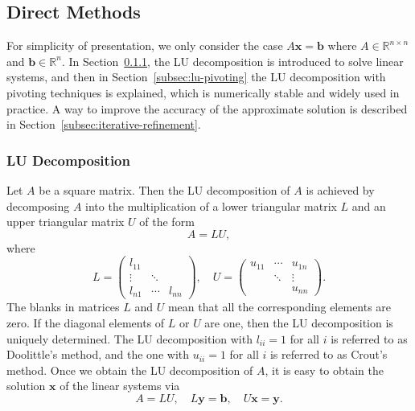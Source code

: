 \subsection{{Direct Methods}}\label{sec:direct-methods}
{For simplicity of presentation, we only consider the case $A\bm x=\bm b$ where $A\in\mathbb R^{n\times n}$ and $\bm b\in\mathbb R^n$. In Section~\ref{subsec:lu-decomposition}, the LU decomposition is introduced to solve linear systems, and then in Section~\ref{subsec:lu-pivoting} the LU decomposition with pivoting techniques is explained, which is numerically stable and widely used in practice. A way to improve the accuracy of the approximate solution is described in Section~\ref{subsec:iterative-refinement}.}
\subsubsection{{LU Decomposition}}\label{subsec:lu-decomposition}
{Let $A$ be a square matrix. Then the LU decomposition of $A$ is achieved by decomposing $A$ into the multiplication of a lower triangular matrix $L$ and an upper triangular matrix $U$ of the form}
\begin{equation}\label{eq:lu-factorization}A=LU,\end{equation}
{where}
\[
L=\begin{pmatrix}l_{11}&&\\\vdots&\ddots&\\l_{n1}&\cdots&l_{nn}\end{pmatrix},\quad
U=\begin{pmatrix}u_{11}&\cdots&u_{1n}\\&\ddots&\vdots\\&&u_{nn}\end{pmatrix}.
\]
{The blanks in matrices $L$ and $U$ mean that all the corresponding elements are zero.}
{If the diagonal elements of $L$ or $U$ are one, then the LU decomposition is uniquely determined. The LU decomposition with $l_{ii}=1$ for all $i$ is referred to as Doolittle's method, and the one with $u_{ii}=1$ for all $i$ is referred to as Crout's method. Once we obtain the LU decomposition of $A$, it is easy to obtain the solution $\bm x$ of the linear systems via}
\begin{equation}\label{eq:lu-triangular-solves}A=LU,\quad L\bm y=\bm b,\quad U\bm x=\bm y.\end{equation}
